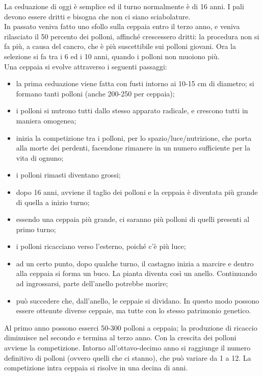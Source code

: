 La ceduazione di oggi è semplice ed il turno normalmente è di 16 anni. I pali devono essere dritti e bisogna che non ci siano sciabolature.\\
In passato veniva fatto uno sfollo sulla ceppaia entro il terzo anno, e veniva rilasciato il 50 percento dei polloni, affinché crescessero dritti: la procedura non si fa più, a causa del cancro, che è più suscettibile sui polloni giovani. Ora la selezione si fa tra i 6 ed i 10 anni, quando i polloni non muoiono più.\\
Una ceppaia si evolve attraverso i seguenti passaggi:
\begin{itemize}[nosep]
    \item la prima ceduazione viene fatta con fusti intorno ai 10-15 cm di diametro; si formano tanti polloni (anche 200-250 per ceppaia);
    \item i polloni si nutrono tutti dallo stesso apparato radicale, e crescono tutti in maniera omogenea;
    \item inizia la competizione tra i polloni, per lo spazio/luce/nutrizione, che porta alla morte dei perdenti, facendone rimanere in un numero sufficiente per la vita di ognuno;
    \item i polloni rimasti diventano grossi;
    \item dopo 16 anni, avviene il taglio dei polloni e la ceppaia è diventata più grande di quella a inizio turno;
    \item essendo una ceppaia più grande, ci saranno più polloni di quelli presenti al primo turno;
    \item i polloni ricacciano verso l'esterno, poiché c'è più luce;
    \item ad un certo punto, dopo qualche turno, il castagno inizia a marcire e dentro alla ceppaia si forma un buco. La pianta diventa così un anello. Continuando ad ingrossarsi, parte dell'anello potrebbe morire;
    \item può succedere che, dall'anello, le ceppaie si dividano. In questo modo possono essere ottenute diverse ceppaie, ma tutte con lo stesso patrimonio genetico. 
\end{itemize} 
Al primo anno possono esserci 50-300 polloni a ceppaia; la produzione di ricaccio diminuisce nel secondo e termina al terzo anno. Con la crescita dei polloni avviene la competizione. Intorno all'ottavo-decimo anno si raggiunge il numero definitivo di polloni (ovvero quelli che ci stanno), che può variare da 1 a 12. La competizione intra ceppaia si risolve in una decina di anni.\\
